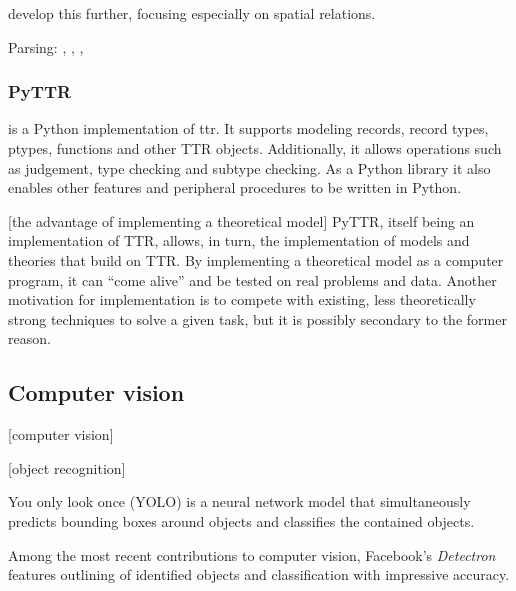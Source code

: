 \documentclass[11pt, a4paper]{article}
\begin{document}
\cite{ttrspat} develop this further, focusing especially on spatial relations.

\cite{LarssonFormalsemanticsperceptual2015}

Parsing: \cite{CooperRecordsRecordTypes2005}, \cite{RobinCooperAustiniantruthattitudes2005}, \cite{CooperTypetheorysemantics2012}, \cite{CooperTypetheorylanguage2016}



\subsubsection{PyTTR}

\cite{pyttr} is a Python implementation of \gls{ttr}.
It supports modeling records, record types, ptypes, functions and other TTR objects.
Additionally, it allows operations such as judgement, type checking and subtype checking.
As a Python library it also enables other features and peripheral procedures to be written in Python.

[the advantage of implementing a theoretical model]
PyTTR, itself being an implementation of TTR, allows, in turn, the implementation of models and theories that build on TTR.
By implementing a theoretical model as a computer program, it can ``come alive'' and be tested on real problems and data.
Another motivation for implementation is to compete with existing, less theoretically strong techniques to solve a given task, but it is possibly secondary to the former reason.




\subsection{Computer vision}

[computer vision]

[object recognition]

You only look once (YOLO) \citep{RedmonYouOnlyLook2015} is a neural network model that simultaneously predicts bounding boxes around objects and classifies the contained objects.

Among the most recent contributions to computer vision, Facebook's \textit{Detectron} \citep{Detectron2018} features outlining of identified objects and classification with impressive accuracy.
\end{document}
